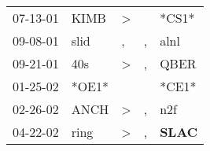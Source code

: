 \begin{supertabular}{p{0.07\textwidth}p{0.06\textwidth}p{0.02\textwidth}p{0.02\textwidth}p{0.06\textwidth}}
 07-13-01\textsuperscript{} &  KIMB\textsuperscript{} &     \textgreater &    &                            *CS1* \\
 09-08-01\textsuperscript{} &  slid\textsuperscript{} &                , &  , &           alnl\textsuperscript{} \\
 09-21-01\textsuperscript{} &   40s\textsuperscript{} &     \textgreater &  , &           QBER\textsuperscript{} \\
 01-25-02\textsuperscript{} &                   *OE1* &                  &    &                            *CE1* \\
 02-26-02\textsuperscript{} &  ANCH\textsuperscript{} &     \textgreater &  , &            n2f\textsuperscript{} \\
 04-22-02\textsuperscript{} &  ring\textsuperscript{} &     \textgreater &  , &  \textbf{SLAC\textsuperscript{}} \\
\end{supertabular}
